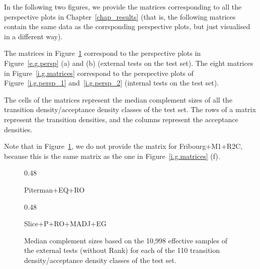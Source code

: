 In the following two figures, we provide the matrices corresponding to all the perspective plots in Chapter~\ref{chap_results} (that is, the following matrices contain the same data as the corrsponding perspective plots, but just visualised in a different way).

The matrices in Figure~\ref{e.g.matrices} correspond to the perspective plots in Figure~\ref{e.g.persp} (a) and (b) (external tests on the \goal{} test set). The eight matrices in Figure~\ref{i.g.matrices} correspond to the perspective plots of Figure~\ref{i.g.persp_1} and~\ref{i.g.persp_2} (internal tests on the \goal{} test set).

The cells of the matrices represent the median complement sizes of all the transition density/acceptance density classes of the \goal{} test set. The rows of a matrix represent the transition densities, and the columns represent the acceptance densities.

Note that in Figure~\ref{e.g.matrices}, we do not provide the matrix for Fribourg+M1+R2C, because this is the same matrix as the one in Figure~\ref{i.g.matrices} (f).



\renewcommand{\arraystretch}{1.4}

\renewcommand{\subwidth}{0.48}


\vskip1.5cm

\begin{figure}[htb]
  \centering
  \begin{scriptsize}
  \renewcommand{\tabcolsep}{0.05cm}
  \begin{subtable}[t]{\subwidth\textwidth}
    \centering
    
    \caption{Piterman+EQ+RO}
  \end{subtable}
  \hfill
  \begin{subtable}[t]{\subwidth\textwidth}
    \centering
    
    \caption{Slice+P+RO+MADJ+EG}
  \end{subtable}
\end{scriptsize}
\caption{Median complement sizes based on the 10,998 effective samples of the external tests (without Rank) for each of the 110 transition density/acceptance density classes of the \goal{} test set.}
\label{e.g.matrices}
\end{figure}


